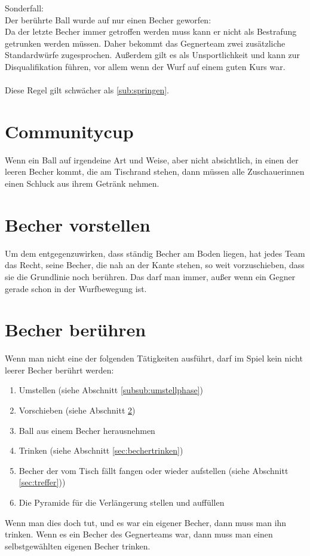 \documentclass[a5paper, 12pt]{book}
\begin{document}
Sonderfall: \\Der berührte Ball wurde auf nur einen Becher geworfen:\\
	Da der letzte Becher immer getroffen werden muss kann er nicht als Bestrafung getrunken werden müssen. Daher bekommt das Gegnerteam zwei zusätzliche Standardwürfe zugesprochen. 
Außerdem gilt es als Unsportlichkeit und kann zur Disqualifikation führen, vor allem wenn der Wurf auf einem guten Kurs war.
\\\\
Diese Regel gilt schwächer als \ref{sub:springen}.

\section{Communitycup}\label{sec:communitycup}
Wenn ein Ball auf irgendeine Art und Weise, aber nicht absichtlich, in einen der leeren Becher kommt, die am Tischrand stehen, dann müssen alle Zuschauerinnen einen Schluck aus ihrem Getränk nehmen.
\section{Becher vorstellen}\label{sec:bechervorstellen}
Um dem entgegenzuwirken, dass ständig Becher am Boden liegen, hat jedes Team das Recht, seine Becher, die nah an der Kante stehen, so weit vorzuschieben, dass sie die Grundlinie noch berühren. 
Das darf man immer, außer wenn ein Gegner gerade schon in der Wurfbewegung ist. 

\section{Becher berühren}\label{sec:becherberühren}
Wenn man nicht eine der folgenden Tätigkeiten ausführt, darf im Spiel kein nicht leerer Becher berührt werden:
\begin{enumerate} [(1)]
    \item Umstellen (siehe Abschnitt \ref{subsub:umstellphase})
    \item Vorschieben (siehe Abschnitt \ref{sec:bechervorstellen})
    \item Ball aus einem Becher herausnehmen
    \item Trinken (siehe Abschnitt \ref{sec:bechertrinken})
    \item Becher der vom Tisch fällt fangen oder wieder aufstellen (siehe Abschnitt \ref{sec:treffer}))
    \item Die Pyramide für die Verlängerung stellen und auffüllen
    
\end{enumerate}
Wenn man dies doch tut, und es war ein eigener Becher, dann muss man ihn trinken. Wenn es ein Becher des Gegnerteams war, dann muss man einen selbstgewählten eigenen Becher trinken. 
\end{document}
